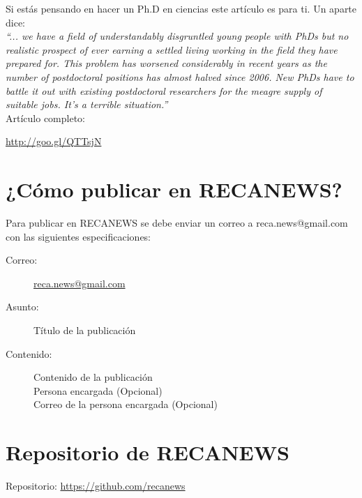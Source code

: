 \documentclass{book}
\begin{document}
Si estás pensando en hacer un Ph.D en ciencias este artículo es para ti. Un aparte dice:\\

\textit{``... we have a field of understandably disgruntled young people with PhDs but no realistic prospect of ever earning a settled living working in the field they have prepared for. This problem has worsened considerably in recent  years as the number of postdoctoral positions has almost halved since 2006. New PhDs have to battle it out with existing postdoctoral researchers for the meagre supply of suitable jobs. It’s a terrible situation.''}\\

Artículo completo:
\begin{center}
\url{http://goo.gl/QTTsjN}
\end{center}


\newpage
\section*{¿Cómo publicar en RECANEWS?}

Para publicar en RECANEWS se debe enviar un correo a reca.news@gmail.com con las siguientes especificaciones:
\begin{description}
\item[Correo:]\url{reca.news@gmail.com}
\item[Asunto:]Título de la publicación
\item[Contenido:]Contenido de la publicación\\
Persona encargada (Opcional)\\
Correo de la persona encargada (Opcional)
\end{description}
  
\section*{Repositorio de RECANEWS}

Repositorio: \url{https://github.com/recanews}\\



\end{document}
